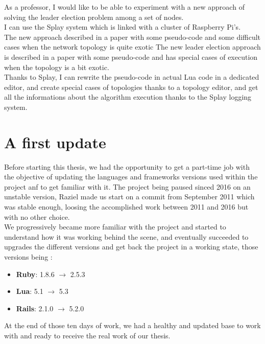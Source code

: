 \documentclass{eplmastersthesis}
\begin{document}
          As a professor, I would like to be able to experiment with a new
          approach of solving the leader election problem among a set of
          nodes.\\
          I can use the Splay system which is linked with a cluster of
          Raspberry Pi's.\\
          The new approach described in a paper with some pseudo-code and some difficult
          cases when the network topology is quite exotic
          The new leader election approach is described in a paper with some
          pseudo-code and has special cases of execution when the topology is
          a bit exotic.\\
          Thanks to Splay, I can rewrite the pseudo-code in actual Lua code
          in a dedicated editor, and create special cases of topologies
          thanks to a topology editor, and get all the informations about
          the algorithm execution thanks to the Splay logging system.

    \section{A first update}

      Before starting this thesis, we had the opportunity to get a part-time
      job with the objective of updating the languages and frameworks versions
      used within the project anf to get familiar with it. The project being
      paused sinced 2016 on an unstable version, Raziel made us start on a
      commit from September 2011 which was stable enough, loosing the
      accomplished work between 2011 and 2016 but with no other choice.\\

      We progressively became more familiar with the project and started to
      understand how it was working behind the scene, and eventually succeeded
      to upgrades the different versions and get back the project in a working
      state, those versions being :

      \begin{itemize}
        \item \textbf{Ruby}: 1.8.6 $\rightarrow$ 2.5.3
        \item \textbf{Lua}: 5.1 $\rightarrow$ 5.3
        \item \textbf{Rails}: 2.1.0 $\rightarrow$ 5.2.0
      \end{itemize}

      At the end of those ten days of work, we had a healthy and updated
      base to work with and ready to receive the real work of our thesis.\\
\end{document}
